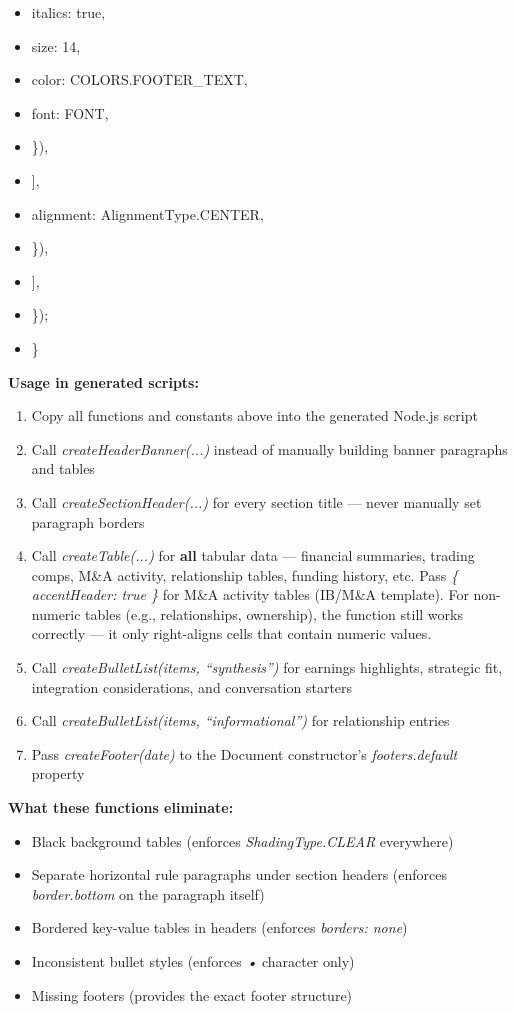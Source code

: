 \documentclass[11pt]{article}
\begin{document}
\begin{itemize}[leftmargin=*,itemsep=2pt,topsep=2pt]
\item {} italics: true,
\item {} size: 14,
\item {} color: COLORS.FOOTER\_\allowbreak{}TEXT,
\item {} font: FONT,
\item {} \}),
\item {} ],
\item {} alignment: AlignmentType.CENTER,
\item {} \}),
\item {} ],
\item {} \});
\item {} \}
\end{itemize}

\textbf{Usage in generated scripts:}

\begin{enumerate}[leftmargin=*,itemsep=2pt,topsep=2pt]
\item {} Copy all functions and constants above into the generated Node.js script
\item {} Call \emph{createHeaderBanner(...)} instead of manually building banner paragraphs and tables
\item {} Call \emph{createSectionHeader(...)} for every section title — never manually set paragraph borders
\item {} Call \emph{createTable(...)} for \textbf{all} tabular data — financial summaries, trading comps, M\&A activity, relationship tables, funding history, etc. Pass \emph{\{ accentHeader: true \}} for M\&A activity tables (IB/M\&A template). For non-numeric tables (e.g., relationships, ownership), the function still works correctly — it only right-aligns cells that contain numeric values.
\item {} Call \emph{createBulletList(items, ``synthesis'')} for earnings highlights, strategic fit, integration considerations, and conversation starters
\item {} Call \emph{createBulletList(items, ``informational'')} for relationship entries
\item {} Pass \emph{createFooter(date)} to the Document constructor's \emph{footers.default} property
\end{enumerate}

\textbf{What these functions eliminate:}

\begin{itemize}[leftmargin=*,itemsep=2pt,topsep=2pt]
\item {} Black background tables (enforces \emph{ShadingType.CLEAR} everywhere)
\item {} Separate horizontal rule paragraphs under section headers (enforces \emph{border.bottom} on the paragraph itself)
\item {} Bordered key-value tables in headers (enforces \emph{borders: none})
\item {} Inconsistent bullet styles (enforces \emph{•} character only)
\item {} Missing footers (provides the exact footer structure)
\end{itemize}
\end{document}
